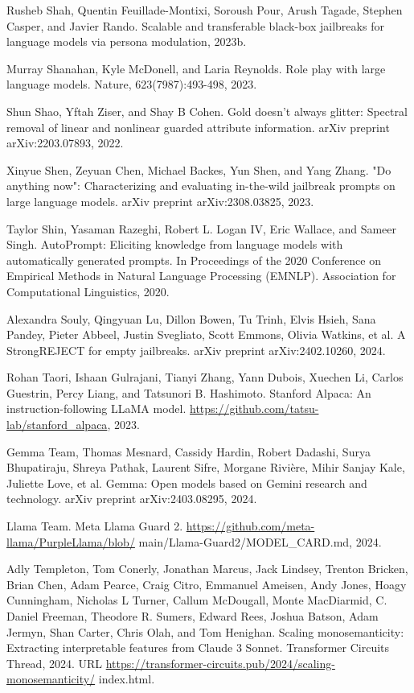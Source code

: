 \documentclass[10pt]{article}
\begin{document}
Rusheb Shah, Quentin Feuillade-Montixi, Soroush Pour, Arush Tagade, Stephen Casper, and Javier Rando. Scalable and transferable black-box jailbreaks for language models via persona modulation, 2023b.

Murray Shanahan, Kyle McDonell, and Laria Reynolds. Role play with large language models. Nature, 623(7987):493-498, 2023.

Shun Shao, Yftah Ziser, and Shay B Cohen. Gold doesn't always glitter: Spectral removal of linear and nonlinear guarded attribute information. arXiv preprint arXiv:2203.07893, 2022.

Xinyue Shen, Zeyuan Chen, Michael Backes, Yun Shen, and Yang Zhang. "Do anything now": Characterizing and evaluating in-the-wild jailbreak prompts on large language models. arXiv preprint arXiv:2308.03825, 2023.

Taylor Shin, Yasaman Razeghi, Robert L. Logan IV, Eric Wallace, and Sameer Singh. AutoPrompt: Eliciting knowledge from language models with automatically generated prompts. In Proceedings of the 2020 Conference on Empirical Methods in Natural Language Processing (EMNLP). Association for Computational Linguistics, 2020.

Alexandra Souly, Qingyuan Lu, Dillon Bowen, Tu Trinh, Elvis Hsieh, Sana Pandey, Pieter Abbeel, Justin Svegliato, Scott Emmons, Olivia Watkins, et al. A StrongREJECT for empty jailbreaks. arXiv preprint arXiv:2402.10260, 2024.

Rohan Taori, Ishaan Gulrajani, Tianyi Zhang, Yann Dubois, Xuechen Li, Carlos Guestrin, Percy Liang, and Tatsunori B. Hashimoto. Stanford Alpaca: An instruction-following LLaMA model. \href{https://github.com/tatsu-lab/stanford_alpaca}{https://github.com/tatsu-lab/stanford\_alpaca}, 2023.

Gemma Team, Thomas Mesnard, Cassidy Hardin, Robert Dadashi, Surya Bhupatiraju, Shreya Pathak, Laurent Sifre, Morgane Rivière, Mihir Sanjay Kale, Juliette Love, et al. Gemma: Open models based on Gemini research and technology. arXiv preprint arXiv:2403.08295, 2024.

Llama Team. Meta Llama Guard 2. \href{https://github.com/meta-llama/PurpleLlama/blob/}{https://github.com/meta-llama/PurpleLlama/blob/} main/Llama-Guard2/MODEL\_CARD.md, 2024.

Adly Templeton, Tom Conerly, Jonathan Marcus, Jack Lindsey, Trenton Bricken, Brian Chen, Adam Pearce, Craig Citro, Emmanuel Ameisen, Andy Jones, Hoagy Cunningham, Nicholas L Turner, Callum McDougall, Monte MacDiarmid, C. Daniel Freeman, Theodore R. Sumers, Edward Rees, Joshua Batson, Adam Jermyn, Shan Carter, Chris Olah, and Tom Henighan. Scaling monosemanticity: Extracting interpretable features from Claude 3 Sonnet. Transformer Circuits Thread, 2024. URL \href{https://transformer-circuits.pub/2024/scaling-monosemanticity/}{https://transformer-circuits.pub/2024/scaling-monosemanticity/} index.html.
\end{document}

